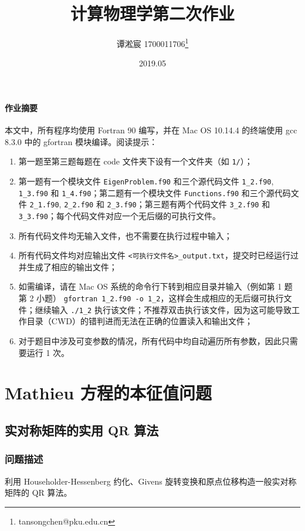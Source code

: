 \documentclass{ctexart}
\begin{document}
\lstset{language=fortran}
\title{计算物理学第二次作业}
\author{谭淞宸 1700011706\thanks{tansongchen@pku.edu.cn}}
\date{2019.05}
\newcommand{\f}{\mathrm{d}}
\maketitle
\paragraph{作业摘要}
本文中，所有程序均使用 Fortran 90 编写，并在 Mac OS 10.14.4 的终端使用 gcc 8.3.0 中的 gfortran 模块编译。阅读提示：
\begin{enumerate}
    \item 第一题至第三题每题在 code 文件夹下设有一个文件夹（如 \verb|1/|）；
    \item 第一题有一个模块文件 \verb|EigenProblem.f90| 和三个源代码文件 \verb|1_2.f90|, \verb|1_3.f90| 和 \verb|1_4.f90|；第二题有一个模块文件 \verb|Functions.f90| 和三个源代码文件 \verb|2_1.f90|, \verb|2_2.f90| 和 \verb|2_3.f90|；第三题有两个代码文件 \verb|3_2.f90| 和 \verb|3_3.f90|；每个代码文件对应一个无后缀的可执行文件。
    \item 所有代码文件均无输入文件，也不需要在执行过程中输入；
    \item 所有代码文件均对应输出文件 \verb|<可执行文件名>_output.txt|，提交时已经运行过并生成了相应的输出文件；
    \item 如需编译，请在 Mac OS 系统的命令行下转到相应目录并输入（例如第 1 题第 2 小题） \verb|gfortran 1_2.f90 -o 1_2|，这样会生成相应的无后缀可执行文件；继续输入 \verb|./1_2| 执行该文件；不推荐双击执行该文件，因为这可能导致工作目录（CWD）的错判进而无法在正确的位置读入和输出文件；
    \item 对于题目中涉及可变参数的情况，所有代码中均自动遍历所有参数，因此只需要运行 1 次。
\end{enumerate}
\newpage
\section{Mathieu 方程的本征值问题}
\subsection{实对称矩阵的实用 QR 算法}
\subsubsection{问题描述}
利用 Householder-Hessenberg 约化、Givens 旋转变换和原点位移构造一般实对称矩阵的 QR 算法。
\end{document}
